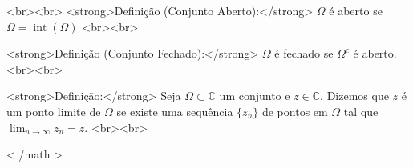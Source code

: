 <br><br>
<strong>Definição (Conjunto Aberto):</strong>
$\Omega$ é aberto se $\Omega = \operatorname{int}(\Omega)$
<br><br>

<strong>Definição (Conjunto Fechado):</strong>
$\Omega$ é fechado se $\Omega^c$ é aberto.
<br><br>

<strong>Definição:</strong>
Seja $\Omega \subset \mathbb{C}$ um conjunto e $z \in \mathbb{C}$. Dizemos que $z$ é um ponto limite de $\Omega$ se existe uma sequência $\{z_n\}$ de pontos em $\Omega$ tal que $\lim_{n \rightarrow \infty}z_n=z.$
<br><br>

{{< /math >}}
